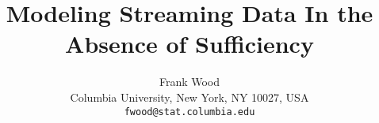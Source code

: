 \documentclass{article}
\title{Modeling Streaming Data In the Absence of Sufficiency}
\author{
Frank Wood\\
Columbia University, New York, NY 10027, USA \\
\texttt{fwood@stat.columbia.edu}
}
\begin{document}
\maketitle
\begin{abstract}

\end{abstract}


%
%



%

%

%

%

%


\renewcommand{\bibsection}{\subsubsection*{References}}
\setlength{\bibsep}{0mm}

\end{document}
